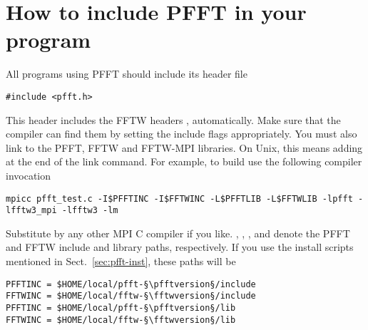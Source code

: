 \section{How to include PFFT in your program}
All programs using PFFT should include its header file
\begin{lstlisting}
#include <pfft.h>
\end{lstlisting}
This header includes the FFTW headers ,  automatically. Make sure that the compiler can find them by setting
the include flags appropriately.
You must also link to the PFFT, FFTW and FFTW-MPI libraries. On Unix, this means adding  at the end of the link command.
For example, to build  use the following compiler invocation
\begin{lstlisting}[prebreak = {\textbackslash}]
mpicc pfft_test.c -I$PFFTINC -I$FFTWINC -L$PFFTLIB -L$FFTWLIB -lpfft -lfftw3_mpi -lfftw3 -lm
\end{lstlisting}
Substitute  by any other MPI C compiler if you like.
, , , and  denote the PFFT and FFTW include and library paths, respectively.
If you use the install scripts mentioned in Sect.~\ref{sec:pfft-inst}, these paths will be
\begin{lstlisting}[escapechar=§,numbers=none]
PFFTINC = $HOME/local/pfft-§\pfftversion§/include
FFTWINC = $HOME/local/fftw-§\fftwversion§/include
PFFTINC = $HOME/local/pfft-§\pfftversion§/lib
FFTWINC = $HOME/local/fftw-§\fftwversion§/lib
\end{lstlisting}


